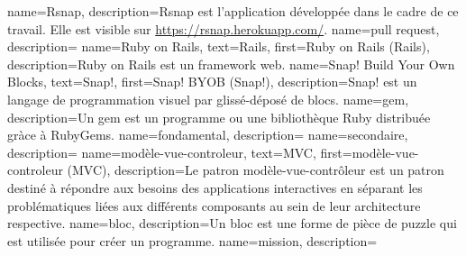 

{
 name=Rsnap,
 description={Rsnap \cite{rsnap} est l'application développée dans le cadre de ce travail. Elle est visible sur \url{https://rsnap.herokuapp.com/}.}
}
{
 name={pull request},
 description={}
}
{
 name={Ruby on Rails},
 text={Rails},
 first={Ruby on Rails (Rails)},
 description={Ruby on Rails \cite{rails} est un framework web.}
}
{
 name={Snap! Build Your Own Blocks},
 text={Snap!},
 first={Snap! BYOB (Snap!)},
 description={Snap! \cite{snap} est un langage de programmation visuel par glissé-déposé de \glspl{bloc}.}
}
{
 name={gem},
 description={Un gem \cite{gem} est un programme ou une bibliothèque Ruby distribuée gràce à RubyGems.}
}
{
 name={fondamental},
 description={}
}
{
 name={secondaire},
 description={}
}
{
 name={modèle-vue-controleur},
 text={MVC},
 first={modèle-vue-controleur (MVC)},
 description={Le patron modèle-vue-contrôleur \cite{wiki-mvc} est un patron destiné à répondre aux besoins des applications interactives en séparant les problématiques liées aux différents composants au sein de leur architecture respective.}
}
{
 name={bloc},
 description={Un bloc est une forme de pièce de puzzle qui est utilisée pour créer un programme.} %
}
{
 name={mission},
 description={}
}
